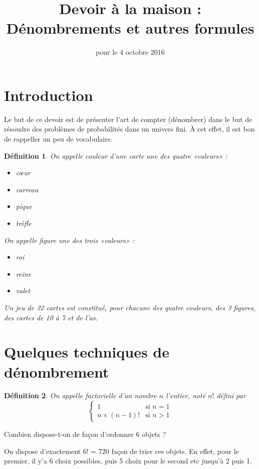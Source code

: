 \documentclass[12pt,a4paper,french]{article}
\title{Devoir à la maison \no{1} : Dénombrements et autres formules}
\author{\bsc{Ts 3}}
\date{pour le 4 octobre 2016}
\makeatletter
\renewcommand{\maketitle}%
{\framebox{%
    \begin{minipage}{1.0\linewidth}%
      \begin{center}%
        \Large \@title ~-- \@author \\%
        \@date%
      \end{center}%
    \end{minipage}}%
  \normalsize%
}
\theoremstyle{break}
\newtheorem{definition}{Définition}
\theoremstyle{plain}
\theoremstyle{nonumberplain}
\theoremstyle{nonumberbreak}
\makeatother
\begin{document}
\maketitle

\section*{Introduction}

Le but de ce devoir est de présenter l'art de compter (dénombrer) dans
le but de résoudre des problèmes de probabilités dans un univers fini. À
cet effet, il est bon de rappeller un peu de vocabulaire.

\begin{definition}
  On appelle \emph{couleur d'une carte} une des quatre «valeurs» :
  \begin{itemize}[label=--]
    \item cœur
    \item carreau
    \item pique
    \item trèfle
  \end{itemize}

  On appelle \emph{figure} une des trois «valeurs» :
  \begin{itemize}[label=--]
    \item roi
    \item reine
    \item valet
  \end{itemize}

  Un \emph{jeu de 32 cartes} est constitué, pour chacune des quatre
  couleurs, des 3 figures, des cartes de 10 à 7 et de l'as.
\end{definition}

\section{Quelques techniques de dénombrement}

\begin{definition}
  On appelle \emph{factorielle} d'un nombre $n$ l'entier, noté $n!$
  défini par \[ \left\lbrace\begin{matrix}1 & \text{si } n = 1 \\
  n\times (n - 1)! & \text{si } n > 1\end{matrix}\right. \]

\end{definition}

\begin{question}[ID=factorielle]
  Combien dispose-t-on de façon d'ordonner 6 objets ?
\end{question}
\begin{solution}
  On dispose d'exactement 6! = 720 façon de trier ces objets. En effet,
  pour le premier, il y'a 6 choix possibles, puis 5 choix pour le second
  etc jusqu'à 2 puis 1.
\end{solution}
\end{document}

